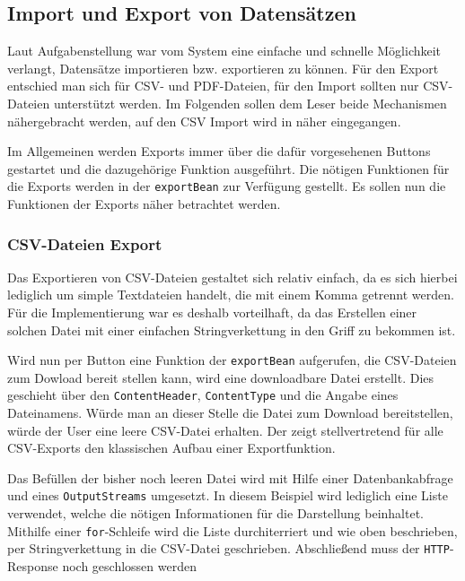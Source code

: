 \subsection{Import und Export von Datensätzen}
Laut Aufgabenstellung war vom System eine einfache und schnelle Möglichkeit verlangt, Datensätze importieren bzw. exportieren zu können.
Für den Export entschied man sich für CSV- und PDF-Dateien, für den Import sollten nur CSV-Dateien unterstützt werden.
Im Folgenden sollen dem Leser beide Mechanismen nähergebracht werden, auf den CSV Import wird in  näher eingegangen. 

Im Allgemeinen werden Exports immer über die dafür vorgesehenen Buttons gestartet und die dazugehörige Funktion ausgeführt.
Die nötigen Funktionen für die Exports werden in der \texttt{exportBean} zur Verfügung gestellt.
Es sollen nun die Funktionen der Exports näher betrachtet werden.

\subsubsection{CSV-Dateien Export}

Das Exportieren von CSV-Dateien gestaltet sich relativ einfach, da es sich hierbei lediglich um simple Textdateien handelt, die mit einem Komma getrennt werden.
Für die Implementierung war es deshalb vorteilhaft, da das Erstellen einer solchen Datei mit einer einfachen Stringverkettung in den Griff zu bekommen ist.

Wird nun per Button eine Funktion der \texttt{exportBean} aufgerufen, die CSV-Dateien zum Dowload bereit stellen kann, wird eine downloadbare Datei erstellt. Dies geschieht über den \texttt{ContentHeader}, \texttt{ContentType} und die Angabe eines Dateinamens.
Würde man an dieser Stelle die Datei zum Download bereitstellen, würde der User eine leere CSV-Datei erhalten.
Der  zeigt stellvertretend für alle CSV-Exports den klassischen Aufbau einer Exportfunktion.

		

Das Befüllen der bisher noch leeren Datei wird mit Hilfe einer Datenbankabfrage und eines \texttt{OutputStreams} umgesetzt.
In diesem Beispiel wird lediglich eine Liste verwendet, welche die nötigen Informationen für die Darstellung beinhaltet.
Mithilfe einer \texttt{for}-Schleife wird die Liste durchiterriert und wie oben beschrieben, per Stringverkettung in die CSV-Datei geschrieben.
Abschließend muss der \texttt{HTTP}-Response noch geschlossen werden
	
